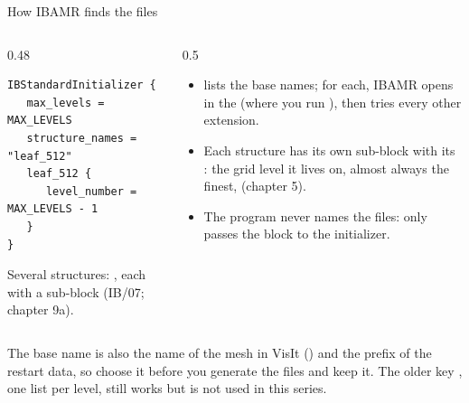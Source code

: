 \documentclass[aspectratio=169,11pt]{beamer}
\begin{document}
\begin{frame}[fragile]{How IBAMR finds the files}
\begin{columns}[T,onlytextwidth]
\begin{column}{0.48\textwidth}
\begin{lstlisting}[style=input]
IBStandardInitializer {
   max_levels = MAX_LEVELS
   structure_names = "leaf_512"
   leaf_512 {
      level_number = MAX_LEVELS - 1
   }
}
\end{lstlisting}
\small Several structures: , each with a sub-block (IB/07; chapter 9a).
\end{column}
\begin{column}{0.5\textwidth}
\small
\begin{itemize}
  \item {} lists the base names; for each, IBAMR opens  in the  (where you run ), then tries every other extension.
  \item Each structure has its own sub-block with its : the grid level it lives on, almost always the finest,  (chapter 5).
  \item The program never names the files:  only passes the  block to the initializer.
\end{itemize}
\end{column}
\end{columns}
\vspace{1mm}
\begin{punchbox}
\small The base name is also the name of the mesh in VisIt () and the prefix of the restart data, so choose it before you generate the files and keep it. The older key , one list per level, still works but is not used in this series.
\end{punchbox}
\end{frame}
\end{document}
